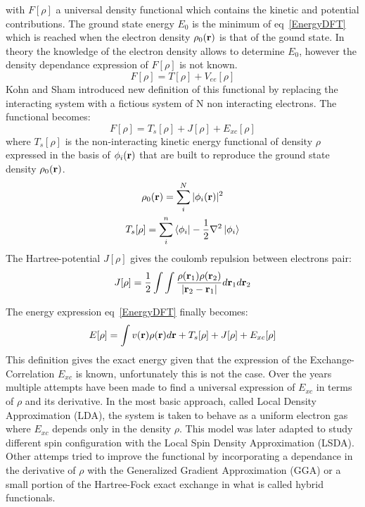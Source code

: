 \documentclass[12pt]{report}
\numberwithin{equation}{section}
\begin{document}
with $F[\rho]$ a universal density functional which contains the kinetic and potential contributions.
The ground state energy $E_0$ is the minimum of eq~\ref{EnergyDFT} which is reached when the electron density $\rho_0(\vb r)$ is that of the gound state.
In theory the knowledge of the electron density allows to determine $E_0$, however the density dependance expression of $F[\rho]$ is not known.
\begin{equation}
    F[\rho]=T[\rho]+V_{ee}[\rho]
\end{equation}
Kohn and Sham introduced new definition of this functional by replacing the interacting system with a fictious system of N non interacting electrons\cite{kohn_self-consistent_1965}.%
The functional becomes:
\begin{equation}
    F[\rho]=T_s[\rho]+J[\rho]+E_{xc}[\rho]
\end{equation}
where $T_s[\rho]$ is the non-interacting kinetic energy functional of density $\rho$ expressed in the basis of $\phi_i (\vb r)$ that are built to reproduce the ground state density $\rho_0(\vb r)$.
\begin{gather}
    \rho_0(\vb r) = \sum_{i}^{N} |\phi_i (\vb r)|^2\\
    T_s[\rho]=\sum_{i}^{n} \bra{\phi_i} -\frac{1}{2}\nabla^2 \ket{\phi_i}
\end{gather}
The Hartree-potential $J[\rho]$ gives the coulomb repulsion between electrons pair:
\begin{equation}
    J[\rho]=\frac{1}{2}\int\int \frac{\rho(\vb r_1) \rho(\vb r_2)}{|\vb r_2 - \vb r_1 |} d\vb r_1 d\vb r_2
\end{equation}

The energy expression eq~\ref{EnergyDFT} finally becomes:
\begin{equation}
    E[\rho]= \int v(\vb r) \rho(\vb r) d\vb r + T_s[\rho] + J[\rho]+ E_{xc}[\rho]
\end{equation}
This definition gives the exact energy given that the expression of the Exchange-Correlation $E_{xc}$ is known, unfortunately this is not the case. 
Over the years multiple attempts have been made to find a universal expression of $E_{xc}$ in terms of $\rho$ and its derivative. 
In the most basic approach, called Local Density Approximation (LDA), the system is taken to behave as a uniform electron gas where $E_{xc}$ depends only in the density $\rho$. 
This model was later adapted to study different spin configuration with the Local Spin Density Approximation (LSDA).
Other attemps tried to improve the functional by incorporating a dependance in the derivative of $\rho$ with the Generalized Gradient Approximation (GGA) or a small portion of the Hartree-Fock exact exchange in what is called hybrid functionals.
\end{document}
